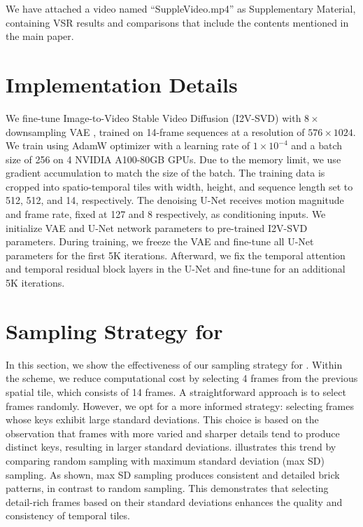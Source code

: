 We have attached a video named ``SuppleVideo.mp4'' as Supplementary Material, containing VSR results and comparisons that include the contents mentioned in the main paper.

\section{Implementation Details}
We fine-tune Image-to-Video Stable Video Diffusion (I2V-SVD) \cite{svd} with $8\times$ downsampling VAE \cite{ldm}, trained on 14-frame sequences at a resolution of $576\times1024$.
We train {\ours} using AdamW optimizer \cite{loshchilov2019decoupled} with a learning rate of $1 \times 10^{-4}$ and a batch size of 256 on 4 NVIDIA A100-80GB GPUs. Due to the memory limit, we use gradient accumulation to match the size of the batch. The training data is cropped into spatio-temporal tiles with width, height, and sequence length set to 512, 512, and 14, respectively. The denoising U-Net receives motion magnitude and frame rate, fixed at 127 and 8 respectively, as conditioning inputs. We initialize VAE and U-Net network parameters to pre-trained I2V-SVD \cite{svd} parameters. During training, we freeze the VAE and fine-tune all U-Net parameters for the first 5K iterations. Afterward, we fix the temporal attention and temporal residual block layers in the U-Net and fine-tune for an additional 5K iterations. 

\section{Sampling Strategy for {\tfiabb}}
In this section, we show the effectiveness of our sampling strategy for {\tfiabb}. Within the {\tfiabb} scheme, we reduce computational cost by selecting 4 frames from the previous spatial tile, which consists of 14 frames. A straightforward approach is to select frames randomly. However, we opt for a more informed strategy: selecting frames whose keys exhibit large standard deviations. This choice is based on the observation that frames with more varied and sharper details tend to produce distinct keys, resulting in larger standard deviations.  illustrates this trend by comparing random sampling with maximum standard deviation (max SD) sampling. As shown, max SD sampling produces consistent and detailed brick patterns, in contrast to random sampling. This demonstrates that selecting detail-rich frames based on their standard deviations enhances the quality and consistency of temporal tiles.

